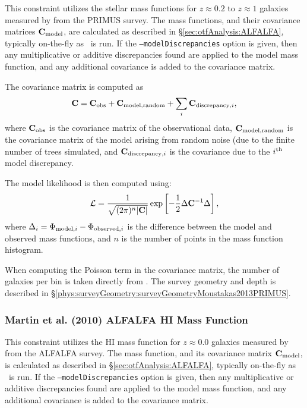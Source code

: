 This constraint utilizes the stellar mass functions for $z\approx 0.2$ to $z\approx 1$ galaxies measured by \cite{moustakas_primus:_2013} from the PRIMUS survey. The mass functions, and their covariance matrices ${\bf C}_{\rm model}$, are calculated as described in \S\ref{sec:otfAnalysis:ALFALFA}, typically on-the-fly as \glc\ is run. If the {\tt --modelDiscrepancies} option is given, then any multiplicative or additive discrepancies found are applied to the model mass function, and any additional covariance is added to the covariance matrix.

The covariance matrix is computed as
\begin{equation}
 {\bf C} = {\bf C}_{\rm obs} + {\bf C}_{\rm model,random} + \sum_i {\bf C}_{{\rm discrepancy}, i},
\end{equation}
where ${\bf C}_{\rm obs}$ is the covariance matrix of the observational data, ${\bf C}_{\rm model,random}$ is the covariance matrix of the model arising from random noise (due to the finite number of trees simulated, and ${\bf C}_{{\rm discrepancy}, i}$ is the covariance due to the $i^{\rm th}$ model discrepancy.

The model likelihood is then computed using:
\begin{equation}
 \mathcal{L} = {1 \over \sqrt{(2 \pi)^n |{\bf C}|}} \exp\left[ -{1\over 2} \Delta {\bf C}^{-1} \Delta \right],
\end{equation}
where $\Delta_i = \Phi_{{\rm model}, i} - \Phi_{{\rm observed}, i}$ is the difference between the model and observed mass functions, and $n$ is the number of points in the mass function histogram.

When computing the Poisson term in the covariance matrix, the number of galaxies per bin is taken directly from \cite{moustakas_primus:_2013}. The survey geometry and depth is described in \S\ref{phys:surveyGeometry:surveyGeometryMoustakas2013PRIMUS}.

\subsubsection{Martin et al. (2010) ALFALFA HI Mass Function}\label{sec:AnalysisALFALFAHIMassFunction}

This constraint utilizes the HI mass function for $z\approx 0.0$ galaxies measured by \cite{martin_arecibo_2010} from the ALFALFA survey. The mass function, and its covariance matrix ${\bf C}_{\rm model}$, is calculated as described in \S\ref{sec:otfAnalysis:ALFALFA}, typically on-the-fly as \glc\ is run. If the {\tt --modelDiscrepancies} option is given, then any multiplicative or additive discrepancies found are applied to the model mass function, and any additional covariance is added to the covariance matrix.

